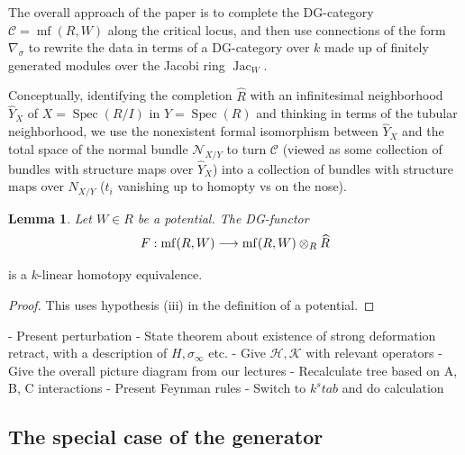 \documentclass[english,letter paper,12pt,leqno]{article}
\newtheorem{lemma}[theorem]{Lemma}
\theoremstyle{example}
\numberwithin{equation}{section}
\def\jac{\operatorname{Jac}_W}
\DeclareMathOperator{\mf}{mf}
\DeclareMathOperator{\Spec}{Spec}
\begin{document}
The overall approach of the paper is to complete the DG-category $\mathscr{C} = \mf(R,W)$ along the critical locus, and then use connections of the form $\nabla_\sigma$ to rewrite the data in terms of a DG-category over $k$ made up of finitely generated modules over the Jacobi ring $\jac$.

Conceptually, identifying the completion $\widehat{R}$ with an infinitesimal neighborhood $\widehat{Y}_X$ of $X = \Spec(R/I)$ in $Y = \Spec(R)$ and thinking in terms of the tubular neighborhood, we use the nonexistent formal isomorphism between $\widehat{Y}_X$ and the total space of the normal bundle $\mathscr{N}_{X/Y}$ to turn $\mathscr{C}$ (viewed as some collection of bundles with structure maps over $\widehat{Y}_X$) into a collection of bundles with structure maps over $N_{X/Y}$ ($t_i$ vanishing up to homopty vs on the nose).

\begin{lemma} Let $W \in R$ be a potential. The DG-functor
\[
F: \mf(R,W) \lto \mf(R, W) \otimes_R \widehat{R}
\]
\end{lemma}
is a $k$-linear homotopy equivalence.
\begin{proof}
This uses hypothesis (iii) in the definition of a potential.
\end{proof}

\begin{itemize}
- Present perturbation
- State theorem about existence of strong deformation retract, with a description of $H, \sigma_\infty$ etc.
- Give $\mathscr{H}, \mathscr{K}$ with relevant operators
- Give the overall picture diagram from our lectures
- Recalculate tree based on A, B, C interactions
- Present Feynman rules
- Switch to $k^stab$ and do calculation
\end{itemize}

\newpage

\subsection{The special case of the generator}
\end{document}
